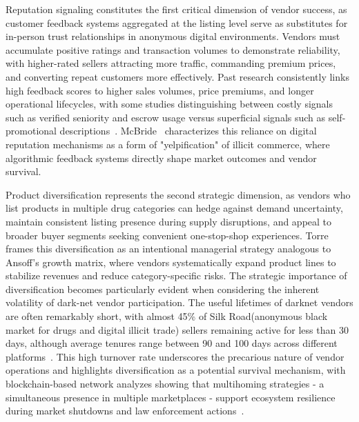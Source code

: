 \documentclass{article}
\begin{document}
Reputation signaling constitutes the first critical dimension of vendor success, as customer feedback systems aggregated at the listing level serve as substitutes for in-person trust relationships in anonymous digital environments. Vendors must accumulate positive ratings and transaction volumes to demonstrate reliability, with higher-rated sellers attracting more traffic, commanding premium prices, and converting repeat customers more effectively. Past research consistently links high feedback scores to higher sales volumes, price premiums, and longer operational lifecycles, with some studies distinguishing between costly signals such as verified seniority and escrow usage versus superficial signals such as self-promotional descriptions~\cite{janetos2017, eschenbaum2021, andrei2025}. McBride~\cite{yelp2023} characterizes this reliance on digital reputation mechanisms as a form of "yelpification" of illicit commerce, where algorithmic feedback systems directly shape market outcomes and vendor survival.

Product diversification represents the second strategic dimension, as vendors who list products in multiple drug categories can hedge against demand uncertainty, maintain consistent listing presence during supply disruptions, and appeal to broader buyer segments seeking convenient one-stop-shop experiences. Torre~\cite{torre2018} frames this diversification as an intentional managerial strategy analogous to Ansoff's growth matrix, where vendors systematically expand product lines to stabilize revenues and reduce category-specific risks. The strategic importance of diversification becomes particularly evident when considering the inherent volatility of dark-net vendor participation. The useful lifetimes of darknet vendors are often remarkably short, with almost 45\% of Silk Road(anonymous black market for drugs and digital illicit trade) sellers remaining active for less than 30 days, although average tenures range between 90 and 100 days across different platforms~\cite{soska2015}. This high turnover rate underscores the precarious nature of vendor operations and highlights diversification as a potential survival mechanism, with blockchain-based network analyzes showing that multihoming strategies - a simultaneous presence in multiple marketplaces - support ecosystem resilience during market shutdowns and law enforcement actions~\cite{fonseca2024multihomers}.
\end{document}
